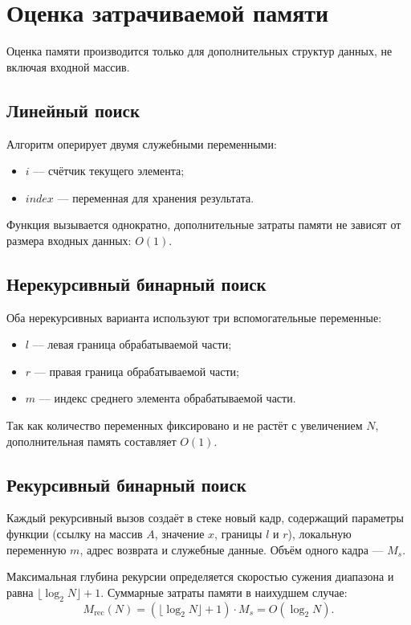 \section{Оценка затрачиваемой памяти}

Оценка памяти производится только для дополнительных структур данных, не включая входной массив.

\subsection{Линейный поиск}

Алгоритм оперирует двумя служебными переменными:
\begin{itemize}
	\item $i$ --- счётчик текущего элемента;
	\item $index$ --- переменная для хранения результата.
\end{itemize}

Функция вызывается однократно, дополнительные затраты памяти не зависят от размера входных данных: $O(1)$.

\subsection{Нерекурсивный бинарный поиск}

Оба нерекурсивных варианта используют три вспомогательные переменные:
\begin{itemize}
	\item $l$ --- левая граница обрабатываемой части;
	\item $r$ --- правая граница обрабатываемой части;
	\item $m$ --- индекс среднего элемента обрабатываемой части.
\end{itemize}

Так как количество переменных фиксировано и не растёт с увеличением $N$, дополнительная память составляет $O(1)$.

\subsection{Рекурсивный бинарный поиск}

Каждый рекурсивный вызов создаёт в стеке новый кадр, содержащий параметры функции (ссылку на массив $A$, значение $x$, границы $l$ и $r$), локальную переменную $m$, адрес возврата и служебные данные. Объём одного кадра --- $M_s$.

Максимальная глубина рекурсии определяется скоростью сужения диапазона и равна $\lfloor \log_2 N \rfloor + 1$. Суммарные затраты памяти в наихудшем случае:
\begin{equation}
	M_{\text{rec}}(N) = (\lfloor \log_2 N \rfloor + 1) \cdot M_s = O(\log_2 N).
\end{equation}

